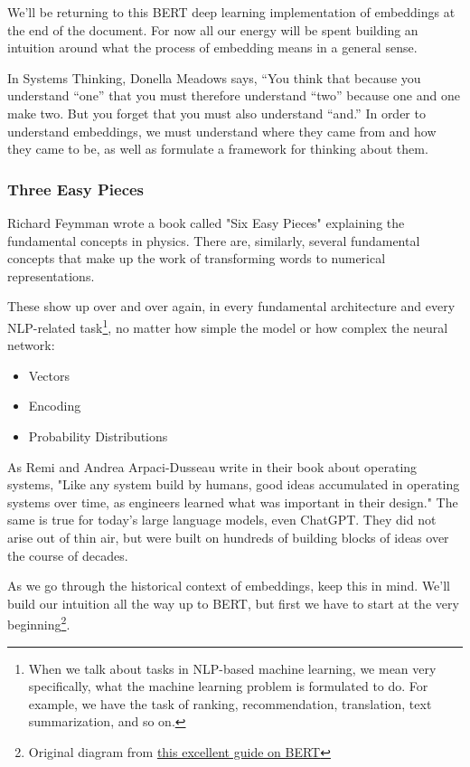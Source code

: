 \documentclass[11pt]{diazessay} %
\begin{document}
We'll be returning to this BERT deep learning implementation of embeddings at the end of the document. For now all our energy will be spent building an intuition around what the process of embedding means in a general sense. 

In Systems Thinking, Donella Meadows says, “You think that because you understand “one” that you must therefore understand “two” because one and one make two. But you forget that you must also understand “and.”\citep{meadows2008thinking} In order to understand embeddings, we must understand where they came from and how they came to be, as well as formulate a framework for thinking about them. 

\subsubsection{Three Easy Pieces}
Richard Feymman wrote a book called "Six Easy Pieces" explaining the fundamental concepts in physics. There are, similarly, several fundamental concepts that make up the work of transforming words to numerical representations. 

These show up over and over again, in every fundamental architecture and every NLP-related task\footnote{When we talk about tasks in NLP-based machine learning, we mean very specifically, what the machine learning problem is formulated to do. For example, we have the task of ranking, recommendation, translation, text summarization, and so on.}, no matter how simple the model or how complex the neural network: 

\begin{itemize}
  \item Vectors
  \item Encoding
  \item Probability Distributions
\end{itemize}

As Remi and Andrea Arpaci-Dusseau write in their book about operating systems, "Like any system build by humans, good ideas accumulated in operating systems over time, as engineers learned what was important in their design."\citep{arpaci2018operating} The same is true for today's large language models, even ChatGPT. They did not arise out of thin air, but were built on hundreds of building blocks of ideas over the course of decades.

As we go through the historical context of embeddings, keep this in mind. We'll build our intuition all the way up to BERT, but first we have to start at the very beginning\footnote{Original diagram from  \href{http://mccormickml.com/2019/11/11/bert-research-ep-1-key-concepts-and-sources/}{this excellent guide on BERT}}. 
\end{document}
